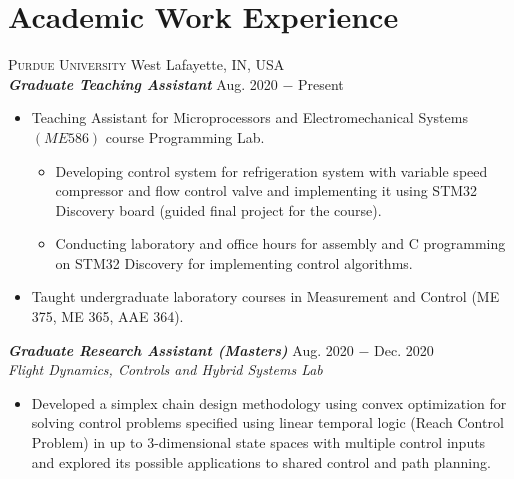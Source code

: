 \documentclass[letterpaper,10pt]{article}
\begin{document}
\section{Academic Work Experience}
\noindent \textsc{Purdue University} \hfill West Lafayette, IN, USA \\
\vspace{3pt}
\noindent \textbf{\textit{Graduate Teaching Assistant}} \hfill Aug. 2020 $-$ Present\\
\begin{itemize}[noitemsep,nolistsep,leftmargin=0.25in,label={--}]
\item Teaching Assistant for Microprocessors and Electromechanical Systems $(ME
586)$ course Programming Lab.
    \begin{itemize} [noitemsep,nolistsep,leftmargin=0.25in,label={--}]
\item Developing control system for refrigeration system with variable speed
compressor and flow control valve and implementing it using STM32 Discovery
board (guided final project for the course).
\item Conducting laboratory and office hours for assembly and C programming on
STM32 Discovery for implementing control algorithms.
    \end{itemize}
\item Taught undergraduate laboratory courses in Measurement and Control (ME
375, ME 365, AAE 364).
\end{itemize}
\vspace{3pt}
\noindent \textbf{\textit{Graduate Research Assistant (Masters)}} \hfill Aug. 2020 $-$ Dec. 2020\\
\textit{Flight Dynamics, Controls and Hybrid Systems Lab}
\begin{itemize}[noitemsep,nolistsep,leftmargin=0.25in,label={--}]
	\item Developed a simplex chain design methodology using convex optimization for solving control problems specified using linear temporal logic (Reach Control Problem) in up to 3-dimensional state spaces with multiple control inputs and explored its possible applications to shared control and path planning.
\end{itemize}



\end{document}

